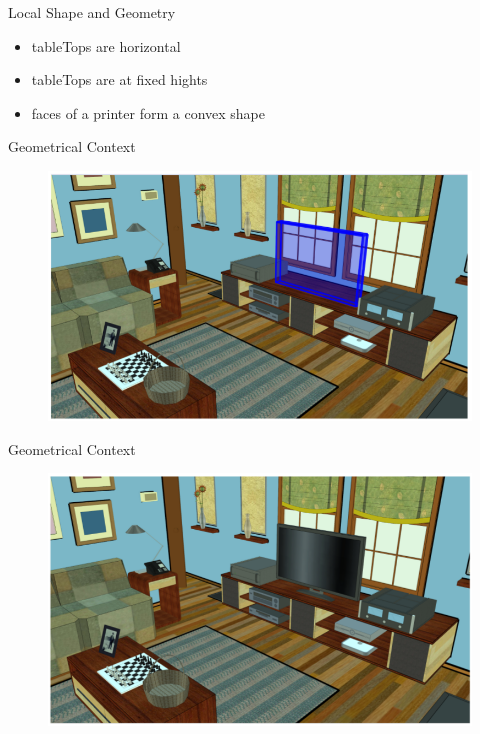 \documentclass{beamer}
\begin{document}
\begin{frame}{Local Shape and Geometry}
\begin{itemize}
\item tableTops are horizontal
\item tableTops are at fixed hights
\item faces of a printer form a convex shape


\end{itemize}

\end{frame}

\begin{frame}{Geometrical Context}
\begin{figure}[t!]
\includegraphics[width=.8\linewidth]{contextHole.png}
\end{figure}
\end{frame}


\begin{frame}{Geometrical Context}
\begin{figure}[t!]
\includegraphics[width=.8\linewidth]{contextHoleFilled.png}
\end{figure}
\end{frame}
\end{document}
